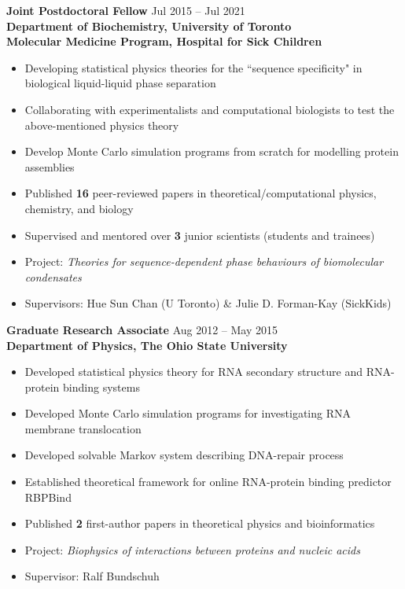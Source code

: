 \documentclass[11pt]{../yhlcv}
\begin{document}
{\bf Joint Postdoctoral Fellow} \hfill Jul 2015 -- Jul 2021\vspace{0.25em} \\
{\bf Department of Biochemistry, University of Toronto  \\ 
Molecular Medicine Program, Hospital for Sick Children}
\vspace{-0.7em}\\
\begin{itemize}[leftmargin=*]\itemsep-0.2em
\item Developing statistical physics theories for the “sequence specificity" in biological liquid-liquid
phase separation
\item Collaborating with experimentalists and computational biologists to test the above-mentioned physics theory
\item Develop Monte Carlo simulation programs from scratch for modelling protein assemblies
\item Published {\bf 16} peer-reviewed papers in theoretical/computational physics, chemistry, and biology
\item Supervised and mentored over {\bf 3} junior scientists (students and trainees)

\item[] Project: {\it Theories for sequence-dependent phase behaviours of biomolecular condensates}
\item[] Supervisors: Hue Sun Chan (U Toronto) \& Julie D. Forman-Kay (SickKids)
\end{itemize} 

{\bf Graduate Research Associate} \hfill Aug 2012 -- May 2015\vspace{0.25em} \\
{\bf Department of Physics, The Ohio State University}
\vspace{-0.7em}\\
\begin{itemize}[leftmargin=*]\itemsep-0.2em
\item Developed statistical physics theory for RNA secondary structure and RNA-protein binding systems
\item Developed Monte Carlo simulation programs for investigating RNA membrane translocation
\item Developed solvable Markov system describing DNA-repair process
\item Established theoretical framework for online RNA-protein binding predictor RBPBind
\item Published {\bf 2} first-author papers in theoretical physics and bioinformatics
\item[] Project: {\it Biophysics of interactions between proteins and nucleic acids}
\item[] Supervisor: Ralf Bundschuh
\end{itemize}
\end{document}
